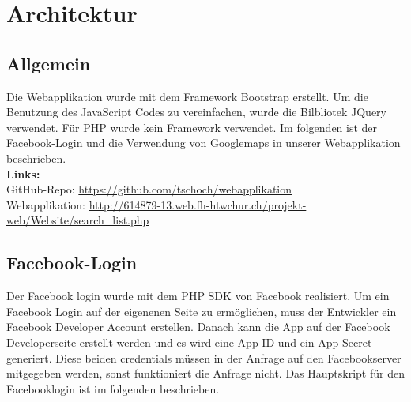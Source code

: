 \documentclass[11pt,a4paper]{scrreprt}
\begin{document}
\newpage
 


 
 

\chapter{Architektur}
\section{Allgemein}
Die Webapplikation wurde mit dem Framework Bootstrap erstellt.
Um die Benutzung des JavaScript Codes zu vereinfachen, wurde die Bilbliotek JQuery verwendet. Für PHP wurde kein Framework verwendet.
Im folgenden ist der Facebook-Login und die Verwendung von Googlemaps in unserer Webapplikation beschrieben.\\

\noindent
\textbf{Links:}\\
GitHub-Repo: \url{https://github.com/tschoch/webapplikation}\\
Webapplikation: \url{http://614879-13.web.fh-htwchur.ch/projekt-web/Website/search_list.php}

\section{Facebook-Login}
Der Facebook login wurde mit dem PHP SDK \cite{phpsdk} von Facebook realisiert.
Um ein Facebook Login auf der eigenenen Seite zu ermöglichen, muss der Entwickler ein Facebook Developer Account erstellen. Danach kann die App auf der Facebook Developerseite erstellt werden und es wird eine App-ID und ein App-Secret generiert. Diese beiden credentials müssen in der Anfrage auf den Facebookserver mitgegeben werden, sonst funktioniert die Anfrage nicht.
Das Hauptskript für den Facebooklogin ist im folgenden beschrieben.\\
\end{document}
